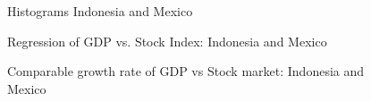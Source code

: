 \documentclass[12pt,a4paper,english]{article}
\begin{document}
\begin{figure}[H]
	\centering
	
	\caption{Histograms Indonesia and Mexico}
    \label{histograms_indonesia_mexico}
\end{figure}

\begin{figure}[H]
	\centering
	
	\caption{Regression of GDP vs. Stock Index: Indonesia and Mexico}
    \label{indonesia_mexico_regression}
\end{figure}

\begin{figure}[H]
	\centering
	
	\caption{Comparable growth rate of GDP vs Stock market: Indonesia and Mexico}
    \label{indonesia_mexico_growth_100}
\end{figure}
\end{document}
